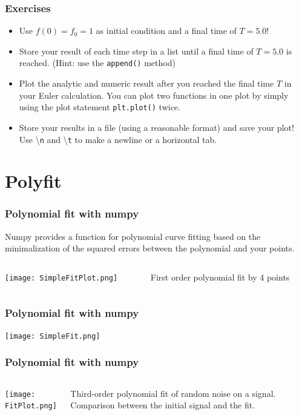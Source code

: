 \documentclass{beamer}
\begin{document}
\begin{frame}
\frametitle{Exercises}
	\begin{itemize}
		\item Use $f(0) = f_0 = 1$ as initial condition and a final time of $T = 5.0$!
		\item Store your result of each time step in a list until a final time of $T= 5.0$ is reached. (Hint: use the \texttt{append()} method)
		\item Plot the analytic and numeric result after you reached the final time $T$ in your Euler calculation. You can plot two functions in one plot by simply using the plot statement \texttt{plt.plot()} twice.
		\item Store your results in a file (using a reasonable format) and save your plot! Use \textbackslash\texttt{n} and \textbackslash\texttt{t} to make a newline or a horizontal tab.
		
	\end{itemize}
\end{frame}

\section{Polyfit}
\begin{frame}
\frametitle{Polynomial fit with numpy}
	Numpy provides a function for polynomial curve fitting based on the minimalization of the squared errors between the polynomial and your points. \\
	\begin{columns}[T]
		\begin{column}[T]{0.6\textwidth}
			\texttt{[image: SimpleFitPlot.png]}
		\end{column}
		\begin{column}[T]{0.4\textwidth}
			First order polynomial fit by 4 points
		\end{column}
	\end{columns}
	
\end{frame}

\begin{frame}
\frametitle{Polynomial fit with numpy}
	\texttt{[image: SimpleFit.png]}
\end{frame}

\begin{frame}
\frametitle{Polynomial fit with numpy}
\begin{columns}[T]
		\begin{column}[T]{0.8\textwidth}
			\texttt{[image: FitPlot.png]}
		\end{column}
		\begin{column}[T]{0.2\textwidth}
			Third-order polynomial fit of random noise on a signal. Comparison between the initial signal and the fit.
		\end{column}
	\end{columns}
\end{frame}
\end{document}
